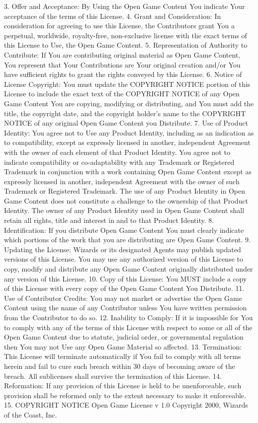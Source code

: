 {3. Offer and Acceptance: By Using the Open Game Content You indicate Your acceptance of the terms of this License.
4. Grant and Consideration: In consideration for agreeing to use this License, the Contributors grant You a perpetual, worldwide, royalty-free, non-exclusive license with the exact terms of this License to Use, the Open Game Content.
5. Representation of Authority to Contribute: If You are contributing original material as Open Game Content, You represent that Your Contributions are Your original creation and/or You have sufficient rights to grant the rights conveyed by this License.
6. Notice of License Copyright: You must update the COPYRIGHT NOTICE portion of this License to include the exact text of the COPYRIGHT NOTICE of any Open Game Content You are copying, modifying or distributing, and You must add the title, the copyright date, and the copyright holder's name to the COPYRIGHT NOTICE of any original Open Game Content you Distribute.
7. Use of Product Identity: You agree not to Use any Product Identity, including as an indication as to compatibility, except as expressly licensed in another, independent Agreement with the owner of each element of that Product Identity. You agree not to indicate compatibility or co-adaptability with any Trademark or Registered Trademark in conjunction with a work containing Open Game Content except as expressly licensed in another, independent Agreement with the owner of such Trademark or Registered Trademark. The use of any Product Identity in Open Game Content does not constitute a challenge to the ownership of that Product Identity. The owner of any Product Identity used in Open Game Content shall retain all rights, title and interest in and to that Product Identity.
8. Identification: If you distribute Open Game Content You must clearly indicate which portions of the work that you are distributing are Open Game Content.
9. Updating the License: Wizards or its designated Agents may publish updated versions of this License. You may use any authorized version of this License to copy, modify and distribute any Open Game Content originally distributed under any version of this License.
10. Copy of this License: You MUST include a copy of this License with every copy of the Open Game Content You Distribute.
11. Use of Contributor Credits: You may not market or advertise the Open Game Content using the name of any Contributor unless You have written permission from the Contributor to do so.
12. Inability to Comply: If it is impossible for You to comply with any of the terms of this License with respect to some or all of the Open Game Content due to statute, judicial order, or governmental regulation then You may not Use any Open Game Material so affected.
13. Termination: This License will terminate automatically if You fail to comply with all terms herein and fail to cure such breach within 30 days of becoming aware of the breach. All sublicenses shall survive the termination of this License.
14. Reformation: If any provision of this License is held to be unenforceable, such provision shall be reformed only to the extent necessary to make it enforceable.
15. COPYRIGHT NOTICE
Open Game License v 1.0 Copyright 2000, Wizards of the Coast, Inc.


} %
